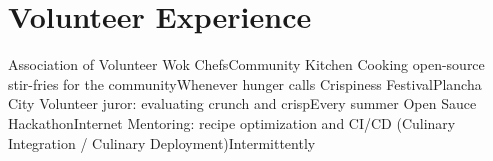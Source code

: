 \section{Volunteer Experience}
\resumeSubHeadingListStart
  \resumeSubheading
    {Association of Volunteer Wok Chefs}{Community Kitchen}
    {Cooking open-source stir-fries for the community}{Whenever hunger calls}
  \resumeSubheading
    {Crispiness Festival}{Plancha City}
    {Volunteer juror: evaluating crunch and crisp}{Every summer}
  \resumeSubheading
    {Open Sauce Hackathon}{Internet}
    {Mentoring: recipe optimization and CI/CD (Culinary Integration / Culinary Deployment)}{Intermittently}
\resumeSubHeadingListEnd
